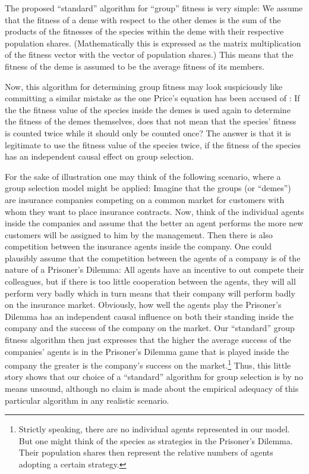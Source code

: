 The proposed ``standard'' algorithm for ``group'' fitness is very simple: We
assume that the fitness of a deme with respect to the other demes is the sum
of the products of the fitnesses of the species within the deme with their
respective population shares. (Mathematically this is expressed as the matrix
multiplication of the fitness vector with the vector of population shares.)
This means that the fitness of the deme is assumed to be the average fitness
of its members.

Now, this algorithm for determining group fitness may look suspiciously like
committing a similar mistake as the one Price's equation has been accused of
\cite[p. 713]{okasha:2005}: If the the fitness value of the species inside the
demes is used again to determine the fitness of the demes themselves, does
that not mean that the species' fitness is counted twice while it should only
be counted once? The answer is that it is legitimate to use the fitness value
of the species twice, if the fitness of the species has an independent causal
effect on group selection. 

For the sake of illustration one may think of the
following scenario, where a group selection model might be applied: Imagine
that the groups (or ``demes'') are insurance companies competing on a common
market for customers with whom they want to place insurance contracts. Now,
think of the individual agents inside the companies and assume that the better
an agent performs the more new customers will be assigned to him by the
management. Then there is also competition between the insurance agents inside
the company. One could plausibly assume that the competition between the agents
of a company is of the nature of a Prisoner's Dilemma: All agents have an
incentive to out compete their colleagues, but if there is too little
cooperation between the agents, they will all perform very badly which in turn
means that their company will perform badly on the insurance market. Obviously,
how well the agents play the Prisoner's Dilemma has an independent causal
influence on both their standing inside the company and the success of the
company on the market. Our ``standard'' group fitness algorithm then just
expresses that the higher the average success of the companies' agents is in
the Prisoner's Dilemma game that is played inside the company the greater is
the company's success on the market.\footnote{Strictly speaking, there are no
individual agents represented in our model. But one might think of the species
as strategies in the Prisoner's Dilemma. Their population shares then represent
the relative numbers of agents adopting a certain strategy.} Thus, this little
story shows that our choice of a ``standard'' algorithm for group selection is
by no means unsound, although no claim is made about the empirical adequacy of
this particular algorithm in any realistic scenario.

